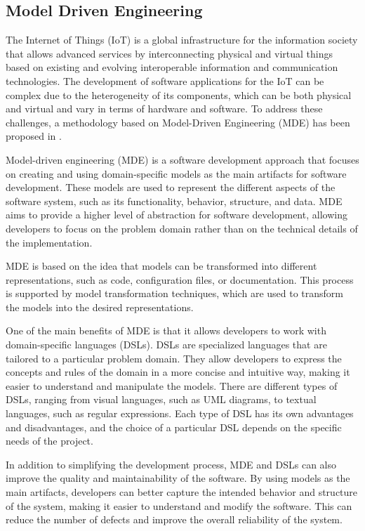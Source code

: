 
\subsection{Model Driven Engineering}
The Internet of Things (IoT) is a global infrastructure for the information society that allows advanced services by interconnecting physical and virtual things based on existing and evolving interoperable information and communication technologies. The development of software applications for the IoT can be complex due to the heterogeneity of its components, which can be both physical and virtual and vary in terms of hardware and software. To address these challenges, a methodology based on Model-Driven Engineering (MDE) has been proposed in \cite{methodologyBasedMDE}.

Model-driven engineering (MDE) is a software development approach that focuses on creating and using domain-specific models as the main artifacts for software development. These models are used to represent the different aspects of the software system, such as its functionality, behavior, structure, and data. MDE aims to provide a higher level of abstraction for software development, allowing developers to focus on the problem domain rather than on the technical details of the implementation.

MDE is based on the idea that models can be transformed into different representations, such as code, configuration files, or documentation. This process is supported by model transformation techniques, which are used to transform the models into the desired representations.

One of the main benefits of MDE is that it allows developers to work with domain-specific languages (DSLs). DSLs are specialized languages that are tailored to a particular problem domain. They allow developers to express the concepts and rules of the domain in a more concise and intuitive way, making it easier to understand and manipulate the models.
There are different types of DSLs, ranging from visual languages, such as UML diagrams, to textual languages, such as regular expressions. Each type of DSL has its own advantages and disadvantages, and the choice of a particular DSL depends on the specific needs of the project.

In addition to simplifying the development process, MDE and DSLs can also improve the quality and maintainability of the software. By using models as the main artifacts, developers can better capture the intended behavior and structure of the system, making it easier to understand and modify the software. This can reduce the number of defects and improve the overall reliability of the system.

